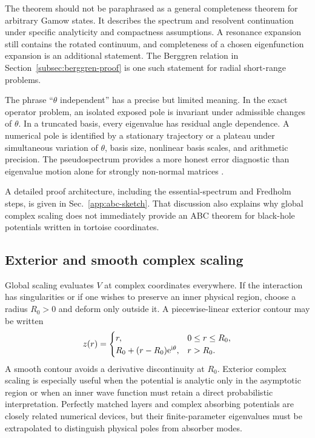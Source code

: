 The theorem should not be paraphrased as a general completeness theorem for
arbitrary Gamow states.  It describes the spectrum and resolvent continuation
under specific analyticity and compactness assumptions.  A resonance
expansion still contains the rotated continuum, and completeness of a chosen
eigenfunction expansion is an additional statement.  The Berggren relation
in Section~\ref{subsec:berggren-proof} is one such statement for radial
short-range problems.

The phrase ``$\theta$ independent'' has a precise but limited meaning.  In the
exact operator problem, an isolated exposed pole is invariant under admissible
changes of $\theta$.  In a truncated basis, every eigenvalue has residual
angle dependence.  A numerical pole is identified by a stationary trajectory
or a plateau under simultaneous variation of $\theta$, basis size, nonlinear
basis scales, and arithmetic precision.  The pseudospectrum provides a more
honest error diagnostic than eigenvalue motion alone for strongly
non-normal matrices
\cite{Davies:2002,Davies:07,Trefethen1999}.

A detailed proof architecture, including the essential-spectrum and
Fredholm steps, is given in Sec.~\ref{app:abc-sketch}.  That discussion
also explains why global complex scaling does not immediately provide an ABC
theorem for black-hole potentials written in tortoise coordinates.

\subsection{Exterior and smooth complex scaling}
\label{subsec:exterior-scaling}

Global scaling evaluates $V$ at complex coordinates everywhere.  If the
interaction has singularities or if one wishes to preserve an inner physical
region, choose a radius $R_0>0$ and deform only outside it.  A piecewise-linear
exterior contour may be written
\begin{equation}
  z(r)=
  \begin{cases}
    r, & 0\le r\le R_0,\\
    R_0+(r-R_0)\mathrm{e}^{\mathrm{i}\theta}, & r>R_0.
  \end{cases}
  \label{eq:ecs-contour}
\end{equation}
A smooth contour avoids a derivative discontinuity at $R_0$.  Exterior
complex scaling is especially useful when the potential is analytic only in
the asymptotic region or when an inner wave function must retain a direct
probabilistic interpretation.  Perfectly matched layers and complex absorbing
potentials are closely related numerical devices, but their finite-parameter
eigenvalues must be extrapolated to distinguish physical poles from absorber
modes.

